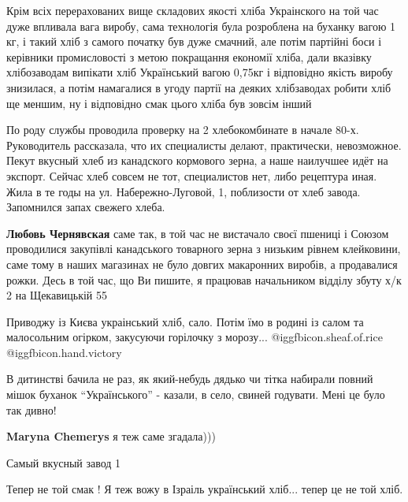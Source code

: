 \begin{itemize}
\begin{itemize}
\begin{itemize}
\end{itemize} %


Крім всіх перерахованих вище складових якості хліба Украінского на той час дуже
впливала вага виробу, сама технологія була розроблена на буханку вагою 1 кг, і
такий хліб з самого початку був дуже смачний, але потім партійні боси і
керівники промисловості з метою покращання економії хліба, дали вказівку
хлібозаводам випікати хліб Український вагою 0,75кг і відповідно якість виробу
знизилася, а потім намагалися в угоду партії на деяких хлібзаводах робити хліб
ще меншим, ну і відповідно смак цього хліба був зовсім інший

\end{itemize} %


По роду службы проводила проверку на 2 хлебокомбинате в начале 80-х.
Руководитель рассказала, что их специалисты делают, практически, невозможное.
Пекут вкусный хлеб из канадского кормового зерна, а наше наилучшее идёт на
экспорт. Сейчас хлеб совсем не тот, специалистов нет, либо рецептура иная. Жила
в те годы на ул. Набережно-Луговой, 1, поблизости от хлеб завода. Запомнился
запах свежего хлеба.

\begin{itemize} %
\textbf{Любовь Чернявская} саме так, в той час не вистачало своєї пшениці і Союзом проводилися закупівлі канадського товарного зерна з низьким рівнем клейковини, саме тому в наших магазинах не було довгих макаронних виробів, а продавалися рожки. Десь в той час, що Ви пишите, я працював начальником відділу збуту х/к 2 на Щекавицькій 55
\end{itemize} %

Приводжу із Києва украінський хліб, сало. Потім їмо в родині із салом та
малосольним огірком, закусуючи горілочку з морозу... @igg{fbicon.sheaf.of.rice} @igg{fbicon.hand.victory}


В дитинстві бачила не раз, як який-небудь дядько чи тітка набирали повний мішок
буханок \enquote{Українського} - казали, в село, свиней годувати. Мені це було так
дивно!

\textbf{Maryna Chemerys} я теж саме згадала)))

Самый вкусный завод 1

Тепер не той смак ! Я теж вожу в Ізраіль український хліб... тепер це не той хліб.


\end{itemize}
